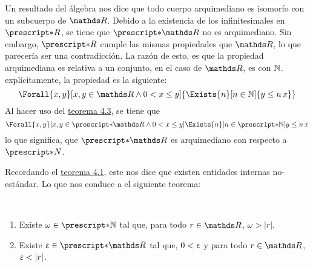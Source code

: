 Un resultado del álgebra nos dice que todo cuerpo arquimediano es
isomorfo con un subcuerpo de $\R$. Debido a la existencia de los
infinitesimales en $\st{R}$, se tiene que $\st{\R}$ no es arquimediano.
Sin embargo, $\st{R}$ cumple las mismas propiedades que $\R$, lo que
parecería ser una contradicción. La razón de esto, es que la propiedad
arquimediana es relativa a un conjunto, en el caso de $\R$, es con $\mathbb{N}$.
explícitamente, la propiedad es la siguiente:
\[\Forall{x,y}[x,y\in\R\land0<x\leq y]{\Exists{n}[n\in\N]{y\leq n\,x}}\]
Al hacer uso del \hyperref[theo:FT]{teorema 4.3}, se tiene que
\[\Forall{x,y}[x,y\in\st{\R}\land 0<x\leq y]{\Exists{n}[n\in\st{\N}]{y\leq n\,x}}\]
lo que significa, que $\st{\R}$ es arquimediano con respecto a $\st{N}$.

Recordando el \hyperref[theo:noEst]{teorema 4.1}, este nos dice que existen
entidades internas no-estándar. Lo que nos conduce a el siguiente teorema:

\begin{theorem}~
  \begin{enumerate}
    \item Existe $\omega\in\st{\N}$ tal que, para todo $r\in\R$,
          $\omega>|r|$.
    \item Existe $\e\in\st{\R}$ tal que, $0<\upvarepsilon$ y para todo $r\in\R$,
          $\upvarepsilon < |r|$.
  \end{enumerate}
\end{theorem}

